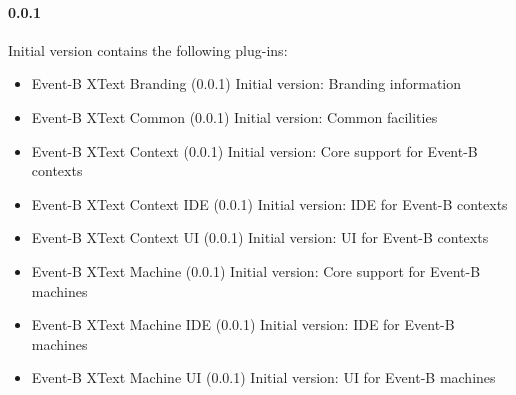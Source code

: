 \paragraph{0.0.1} Initial version contains the following plug-ins:
\begin{itemize}
\item Event-B XText Branding (0.0.1) Initial version: Branding information

\item Event-B XText Common (0.0.1) Initial version: Common facilities

\item Event-B XText Context (0.0.1) Initial version: Core support for Event-B contexts

\item Event-B XText Context IDE (0.0.1) Initial version: IDE for Event-B contexts

\item Event-B XText Context UI (0.0.1) Initial version: UI for Event-B contexts

\item Event-B XText Machine (0.0.1) Initial version: Core support for Event-B machines

\item Event-B XText Machine IDE (0.0.1) Initial version: IDE for Event-B machines

\item Event-B XText Machine UI (0.0.1) Initial version: UI for Event-B machines
\end{itemize}




